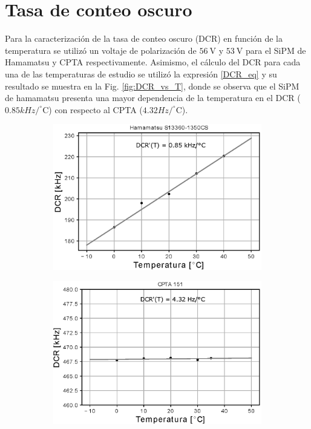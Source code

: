 \section{Tasa de conteo oscuro}
Para la caracterización de la tasa de conteo oscuro (DCR) en función de la temperatura se utilizó un voltaje de polarización de $56~\mbox{V}$ y $53 ~\mbox{V}$ para el SiPM de Hamamatsu y CPTA respectivamente. Asimismo, el cálculo del DCR para cada una de las temperaturas de estudio se utilizó la expresión \ref{DCR_eq} y su resultado se muestra en la Fig. \ref{fig:DCR_vs_T}, donde se observa que el SiPM de hamamatsu presenta una mayor dependencia de la temperatura en el DCR ($0.85 kHz/ ^\circ$C) con respecto al CPTA ($4.32 Hz/ ^\circ$C). 
\begin{figure}[h!]
     \centering
     \begin{subfigure}[b]{0.49\textwidth}
         \centering
         \includegraphics[width=1.1\textwidth]{Images/DCR_T_1350CS.eps}
         \caption{}
         \label{fig:DCR_T_1350CS}
     \end{subfigure}
     \begin{subfigure}[b]{0.49\textwidth}
         \centering
         \includegraphics[width=1.1\textwidth]{Images/DCR_T_CPTA.eps}

\end{subfigure}
\end{figure}

